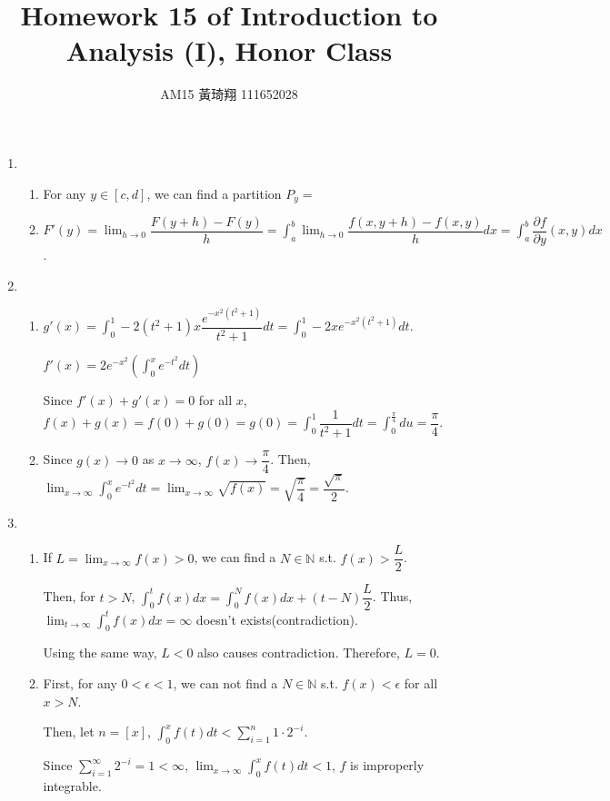 \documentclass[12pt]{article}
\title{Homework 15 of Introduction to Analysis (I), Honor Class}
\author{AM15 黃琦翔 111652028}
\begin{document}
\maketitle
\begin{enumerate}
    \item \begin{enumerate}
        \item For any $y\in [c, d]$, we can find a partition $P_y = $

        \item $F'(y) = \displaystyle\lim_{h\to 0} \dfrac{F(y+h) - F(y)}{h} = \displaystyle\int_a^b \displaystyle\lim_{h\to 0} \dfrac{f(x, y+h) - f(x, y)}{h} dx = \displaystyle\int_a^b \dfrac{\partial f}{\partial y}(x, y) dx$.
    \end{enumerate}

    \item\begin{enumerate}
        \item $g'(x) = \displaystyle\int_0^1 -2(t^2+1)x\dfrac{e^{-x^2(t^2 + 1)}}{t^2+1}dt = \displaystyle\int_0^1 -2xe^{-x^2(t^2+1)} dt$.
        
        $f'(x) = 2e^{-x^2}(\displaystyle\int_0^x e^{-t^2} dt)$

        Since $f'(x) + g'(x) = 0$ for all $x$, $f(x) + g(x) = f(0) + g(0) = g(0) = \displaystyle\int_0^1 \dfrac{1}{t^2 + 1} dt =\displaystyle\int_0^\frac{\pi}{4} du = \dfrac{\pi}{4}$.

        \item Since $g(x) \to 0$ as $x \to \infty$, $f(x) \to \dfrac{\pi}{4}$.
        Then, $\displaystyle\lim_{x\to\infty} \displaystyle\int_0^x e^{-t^2} dt = \displaystyle\lim_{x\to\infty} \sqrt{f(x)} = \sqrt{\dfrac{\pi}{4}} = \dfrac{\sqrt{\pi}}{2}$.
    \end{enumerate}

    \item \begin{enumerate}
        \item If $L = \lim_{x \to \infty} f(x) > 0$, we can find a $N\in\mathbb{N}$ s.t. $f(x) > \dfrac{L}{2}$.
        
        Then, for $t > N$, $\displaystyle\int_0^t f(x) dx = \displaystyle\int_0^N f(x) dx + (t-N)\dfrac{L}{2}$.
        Thus, $\displaystyle\lim_{t\to\infty} \displaystyle\int_0^t f(x) dx = \infty$ doesn't exists(contradiction).

        Using the same way, $L < 0$ also causes contradiction.
        Therefore, $L = 0$.

        \item First, for any $0<\epsilon < 1$, we can not find a $N \in \mathbb{N}$ s.t. $f(x) < \epsilon$ for all $x > N$.
        
        Then, let $n = [x]$, $\displaystyle\int_0^x f(t) dt < \displaystyle\sum_{i=1}^{n} 1 \cdot 2^{-i}$.

        Since $\displaystyle\sum_{i=1}^{\infty} 2^{-i} = 1 < \infty$, $\displaystyle\lim_{x \to \infty}\displaystyle\int_0^x f(t) dt < 1$, $f$ is improperly integrable.
    \end{enumerate}
    
\end{enumerate}
\end{document}

